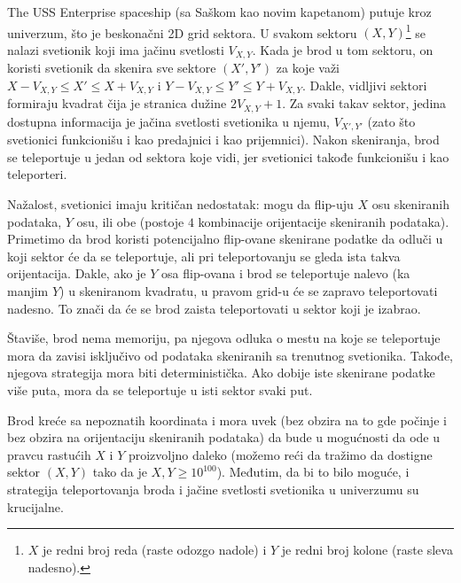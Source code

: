 \documentclass[12pt]{article}
\begin{document}
\renewcommand{\headerLang}{Srpski}
\renewcommand{\problemName}{AB13. VIDLJIVOST}

\renewcommand{\headerLeft}{IATI Dan 1, Senior grupa}
\renewcommand{\headerRightFirst}{XVII MEĐUNARODNI NAPREDNI TURNIR IZ INFORMATIKE}
\renewcommand{\headerRightSecond}{ONLINE 2026}

\renewcommand{\tl}{$5$ s}
\renewcommand{\ml}{$1024$ MB}
\problem{Zadatak \problemName}

The USS Enterprise spaceship (sa Saškom kao novim kapetanom) putuje kroz univerzum, što je beskonačni 2D grid sektora. U svakom sektoru $(X, Y)$\footnote{$X$ je redni broj reda (raste odozgo nadole) i $Y$ je redni broj kolone (raste sleva nadesno).} se nalazi svetionik koji ima jačinu svetlosti $V_{X, Y}$. Kada je brod u tom sektoru, on koristi svetionik da skenira sve sektore $(X', Y')$ za koje važi $X - V_{X, Y} \leq X' \leq X + V_{X, Y}$ i  $Y - V_{X, Y} \leq Y' \leq Y + V_{X, Y}$. Dakle, vidljivi sektori formiraju kvadrat čija je stranica dužine $2V_{X, Y} + 1$. Za svaki takav sektor, jedina dostupna informacija je jačina svetlosti svetionika u njemu, $V_{X', Y'}$ (zato što svetionici funkcionišu i kao predajnici i kao prijemnici). Nakon skeniranja, brod se teleportuje u jedan od sektora koje vidi, jer svetionici takođe funkcionišu i kao teleporteri.

Nažalost, svetionici imaju kritičan nedostatak: mogu da flip-uju $X$ osu skeniranih podataka, $Y$ osu, ili obe (postoje $4$ kombinacije orijentacije skeniranih podataka). Primetimo da brod koristi potencijalno flip-ovane skenirane podatke da odluči u koji sektor će da se teleportuje, ali pri teleportovanju se gleda ista takva orijentacija. Dakle, ako je $Y$ osa flip-ovana i brod se teleportuje nalevo (ka manjim $Y$) u skeniranom kvadratu, u pravom grid-u će se zapravo teleportovati nadesno. To znači da će se brod zaista teleportovati u sektor koji je izabrao.

Štaviše, brod nema memoriju, pa njegova odluka o mestu na koje se teleportuje mora da zavisi isključivo od podataka skeniranih sa trenutnog svetionika. Takođe, njegova strategija mora biti deterministička. Ako dobije iste skenirane podatke više puta, mora da se teleportuje u isti sektor svaki put.

Brod kreće sa nepoznatih koordinata i mora uvek (bez obzira na to gde počinje i bez obzira na orijentaciju skeniranih podataka) da bude u mogućnosti da ode u pravcu rastućih $X$ i $Y$ proizvoljno daleko (možemo reći da tražimo da dostigne sektor $(X, Y)$ tako da je $X, Y \geq 10^{100}$). Međutim, da bi to bilo moguće, i strategija teleportovanja broda i jačine svetlosti svetionika u univerzumu su krucijalne.
\end{document}
